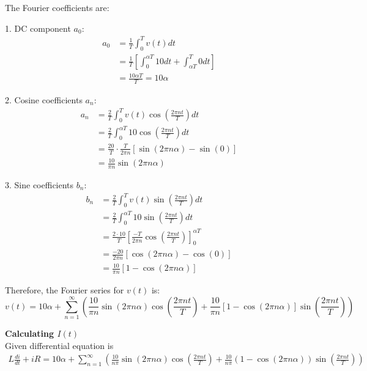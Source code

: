 \documentclass[12pt,a4paper]{report}
\begin{document}
The Fourier coefficients are:

1. DC component $a_0$:
\begin{align}
a_0 &= \frac{1}{T}\int_{0}^{T} v(t)dt \\
&= \frac{1}{T}\left[\int_{0}^{\alpha T} 10 dt + \int_{\alpha T}^{T} 0 dt\right] \\
&= \frac{10\alpha T}{T} = 10\alpha
\end{align}

2. Cosine coefficients $a_n$:
\begin{align}
a_n &= \frac{2}{T}\int_{0}^{T} v(t)\cos\left(\frac{2\pi nt}{T}\right)dt \\
&= \frac{2}{T}\int_{0}^{\alpha T} 10\cos\left(\frac{2\pi nt}{T}\right)dt \\
&= \frac{20}{T} \cdot \frac{T}{2\pi n}[\sin(2\pi n\alpha) - \sin(0)] \\
&= \frac{10}{\pi n}\sin(2\pi n\alpha)
\end{align}

3. Sine coefficients $b_n$:
\begin{align}
b_n &= \frac{2}{T}\int_{0}^{T} v(t)\sin\left(\frac{2\pi nt}{T}\right)dt \\
&= \frac{2}{T}\int_{0}^{\alpha T} 10\sin\left(\frac{2\pi nt}{T}\right)dt \\
&= \frac{2 \cdot 10}{T}\left[\frac{-T}{2\pi n}\cos\left(\frac{2\pi nt}{T}\right)\right]_{0}^{\alpha T} \\
&= \frac{-20}{2\pi n}[\cos(2\pi n\alpha) - \cos(0)] \\
&= \frac{10}{\pi n}[1 - \cos(2\pi n\alpha)]
\end{align}

Therefore, the Fourier series for $v(t)$ is:
\begin{equation}
v(t) = 10\alpha + \sum_{n=1}^{\infty}\left(\frac{10}{\pi n}\sin(2\pi n\alpha)\cos\left(\frac{2\pi nt}{T}\right) + \frac{10}{\pi n}[1-\cos(2\pi n\alpha)]\sin\left(\frac{2\pi nt}{T}\right)\right)
\end{equation}

\textbf{Calculating  $I(t)$}\\
Given differential equation is\\
\begin{align}
L\frac{di}{dt} + iR = 10\alpha + \sum_{n=1}^{\infty}\left(\frac{10}{n\pi}\sin(2\pi n\alpha)\cos\left(\frac{2\pi n t}{T}\right) + \frac{10}{n\pi}(1-\cos(2\pi n\alpha))\sin\left(\frac{2\pi nt}{T}\right)\right)
\end{align}
\end{document}
